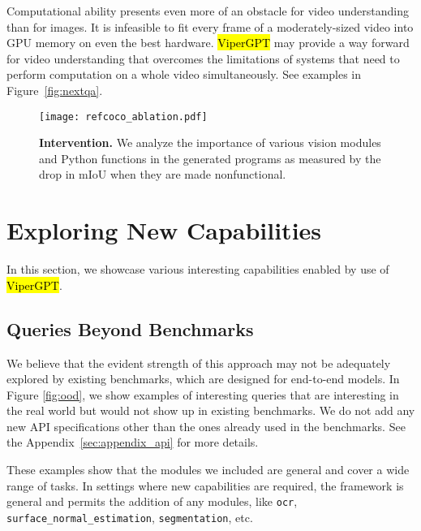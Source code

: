 \documentclass[10pt,twocolumn,letterpaper]{article}
\newcommand{\viper}[0]{{\small\fontfamily{txtt}\selectfont \textcolor{mygreen}{\hl{ViperGPT}}}\xspace}
\begin{document}
Computational ability presents even more of an obstacle for video understanding than for images. It is infeasible to fit every frame of a moderately-sized video into GPU memory on even the best hardware. \viper may provide a way forward for video understanding that overcomes the limitations of systems that need to perform computation on a whole video simultaneously. See examples in Figure~\ref{fig:nextqa}.

\begin{SCfigure}
  \centering
  \texttt{[image: refcoco\_ablation.pdf]}
    \label{fig:intervention}
    \caption{\textbf{Intervention.} We analyze the importance of various \textcolor{myred1}{vision modules} and \textcolor{myred2}{Python functions} in the generated programs as measured by the drop in mIoU when they are made nonfunctional.
  }
\end{SCfigure}

\section{Exploring New Capabilities}

In this section, we showcase various interesting capabilities enabled by use of \viper.

\subsection{Queries Beyond Benchmarks}

We believe that the evident strength of this approach may not be adequately explored by existing benchmarks, which are designed for end-to-end models. In Figure \ref{fig:ood}, we show examples of interesting queries that are interesting in the real world but would not show up in existing benchmarks. We do not add any new API specifications other than the ones already used in the benchmarks. See the Appendix~\ref{sec:appendix_api} for more details.

These examples show that the modules we included are general and cover a wide range of tasks. In settings where new capabilities are required, the framework is general and permits the addition of any modules, like \texttt{ocr}, \texttt{surface\_normal\_estimation}, \texttt{segmentation}, etc.
\end{document}
